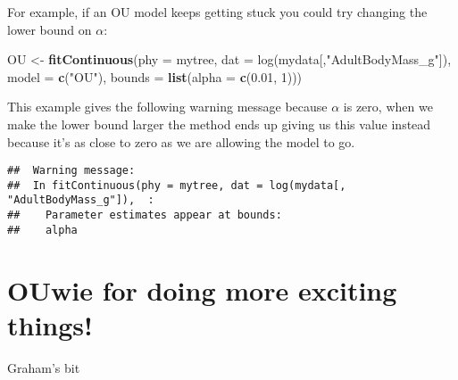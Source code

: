 \documentclass[11pt]{article}
\newcommand{\KeywordTok}[1]{\textcolor[rgb]{0.13,0.29,0.53}{\textbf{{#1}}}}
\newcommand{\DataTypeTok}[1]{\textcolor[rgb]{0.13,0.29,0.53}{{#1}}}
\newcommand{\DecValTok}[1]{\textcolor[rgb]{0.00,0.00,0.81}{{#1}}}
\newcommand{\CharTok}[1]{\textcolor[rgb]{0.31,0.60,0.02}{{#1}}}
\newcommand{\StringTok}[1]{\textcolor[rgb]{0.31,0.60,0.02}{{#1}}}
\newcommand{\NormalTok}[1]{{#1}}
\begin{document}
For example, if an OU model keeps getting stuck you could try changing the lower bound on $\alpha$:

\begin{snugshade}
\begin{Highlighting}[]
\NormalTok{OU <-}\StringTok{ }\KeywordTok{fitContinuous}\NormalTok{(\DataTypeTok{phy = }mytree, \DataTypeTok{dat = }log(mydata[,"AdultBodyMass_g"]),} 
                    \DataTypeTok{model = }\KeywordTok{c}\NormalTok{(}\StringTok{"}\CharTok{OU}\StringTok{"}\NormalTok{), }\DataTypeTok{bounds = }\KeywordTok{list}\NormalTok{(}\DataTypeTok{alpha = }\KeywordTok{c}\NormalTok{(}\DecValTok{0.01}\NormalTok{, }\DecValTok{1}\NormalTok{)))}

\end{Highlighting}
\end{snugshade}

This example gives the following warning message because $\alpha$ is zero, when we make the lower bound larger the method ends up giving us this value instead because it's as close to zero as we are allowing the model to go.

\begin{verbatim}
##  Warning message:
##  In fitContinuous(phy = mytree, dat = log(mydata[, "AdultBodyMass_g"]),  :
##    Parameter estimates appear at bounds:
##    alpha
\end{verbatim}

\section{OUwie for doing more exciting things!}

Graham's bit
\end{document}
